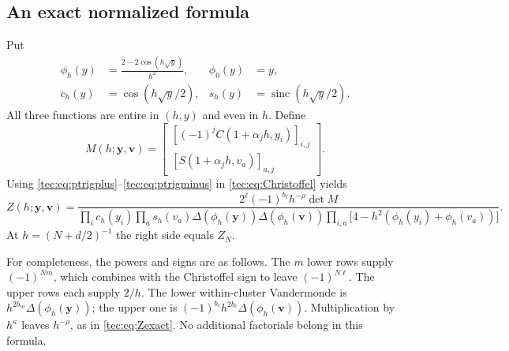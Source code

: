 \documentclass[11pt,a4paper]{article}
\numberwithin{equation}{section}
\theoremstyle{definition}
\theoremstyle{remark}
\newcommand{\by}{\boldsymbol{y}}
\newcommand{\Del}{\Delta}
\newcommand{\bv}{\boldsymbol v}
\newcommand{\sinc}{\operatorname{sinc}}
\begin{document}
\subsection{An exact normalized formula}
Put
\begin{align}
 \phi_h(y)&=\frac{2-2\cos(h\sqrt y)}{h^2},&\phi_0(y)&=y,\\
 c_h(y)&=\cos(h\sqrt y/2),&s_h(y)&=\sinc(h\sqrt y/2).
\end{align}
All three functions are entire in $(h,y)$ and even in $h$. Define
\begin{equation}\label{tec:eq:M}
 M(h;\by,\bv)=
 \begin{bmatrix}
 [(-1)^j C(1+\alpha_jh,y_i)]_{i,j}\\
 [S(1+\alpha_jh,v_a)]_{a,j}
 \end{bmatrix}.
\end{equation}
Using \eqref{tec:eq:ptrigplus}--\eqref{tec:eq:ptrigminus} in
\eqref{tec:eq:Christoffel} yields
\begin{equation}\label{tec:eq:Zexact}
 Z(h;\by,\bv)=
 \frac{2^\ell(-1)^{b_\ell}h^{-\rho}\det M}
 {\displaystyle
  \prod_i c_h(y_i)\prod_a s_h(v_a)
  \Del(\phi_h(\by))\Del(\phi_h(\bv))
  \prod_{i,a}\bigl[4-h^2(\phi_h(y_i)+\phi_h(v_a))\bigr]}.
\end{equation}
At $h=(N+d/2)^{-1}$ the right side equals $Z_N$.

For completeness, the powers and signs are as follows. The $m$ lower
rows supply $(-1)^{Nm}$, which combines with the Christoffel sign to
leave $(-1)^{N\ell}$. The upper rows each supply $2/h$. The lower
within-cluster Vandermonde is $h^{2b_m}\Del(\phi_h(\by))$; the upper
one is $(-1)^{b_\ell}h^{2b_\ell}\Del(\phi_h(\bv))$.
Multiplication by $h^\kappa$ leaves $h^{-\rho}$, as in
\eqref{tec:eq:Zexact}. No additional factorials belong in this formula.
\end{document}
